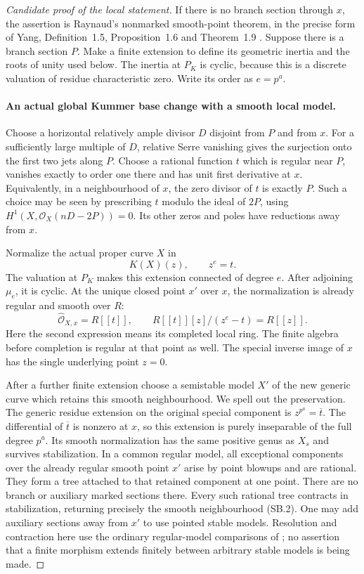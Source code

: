 \begin{proof}[Candidate proof of the local statement]
If there is no branch section through \(x\), the assertion is
Raynaud's nonmarked smooth-point theorem, in the precise form
of Yang, Definition~1.5, Proposition~1.6 and Theorem~1.9
\cite{fghYang2024}. Suppose there is a branch section \(P\).
Make a finite extension to define its geometric inertia and
the roots of unity used below. The inertia at \(P_K\) is
cyclic, because this is a discrete valuation of residue
characteristic zero. Write its order as \(e=p^a\).

\paragraph{An actual global Kummer base change with a smooth local model.}
Choose a horizontal relatively ample divisor \(D\) disjoint
from \(P\) and from \(x\). For a sufficiently large multiple
of \(D\), relative Serre vanishing gives the surjection onto
the first two jets along \(P\). Choose a rational function
\(t\) which is regular near \(P\), vanishes exactly to
order one there and has unit first derivative at \(x\).
Equivalently, in a neighbourhood of \(x\), the zero divisor
of \(t\) is exactly \(P\). Such a choice may be seen by
prescribing \(t\) modulo the ideal of \(2P\), using
\(H^1(X,\mathcal O_X(nD-2P))=0\). Its other zeros and
poles have reductions away from \(x\).

Normalize the actual proper curve \(X\) in
\[
                    K(X)(z),\qquad z^e=t.                 \tag{SB.1}
\]
The valuation at \(P_K\) makes this extension connected
of degree \(e\). After adjoining \(\mu_e\), it is cyclic.
At the unique closed point \(x'\) over \(x\), the
normalization is already regular and smooth over \(R\):
\[
 \widehat{\mathcal O}_{X,x}=R[[t]],\qquad
 R[[t]][z]/(z^e-t)=R[[z]].                               \tag{SB.2}
\]
Here the second expression means its completed local ring.
The finite algebra before completion is regular at that
point as well. The special inverse image of \(x\) has
the single underlying point \(z=0\).

After a further finite extension choose a semistable model
\(X'\) of the new generic curve which retains this smooth
neighbourhood. We spell out the preservation. The generic
residue extension on the original special component is
\(z^{p^a}=\overline t\). The differential of
\(\overline t\) is nonzero at \(x\), so this extension
is purely inseparable of the full degree \(p^a\). Its
smooth normalization has the same positive genus as \(X_s\)
and survives stabilization. In a common regular model,
all exceptional components over the already regular smooth
point \(x'\) arise by point blowups and are rational.
They form a tree attached to that retained component at
one point. There are no branch or auxiliary marked sections
there. Every such rational tree contracts in stabilization,
returning precisely the smooth neighbourhood (SB.2).
One may add auxiliary sections away from \(x'\) to use
pointed stable models. Resolution and contraction here use
the ordinary regular-model comparisons of
\cite[\S9.2 and \S10.3]{fghLiu}; no assertion that a
finite morphism extends finitely between arbitrary stable
models is being made.


\end{proof}
